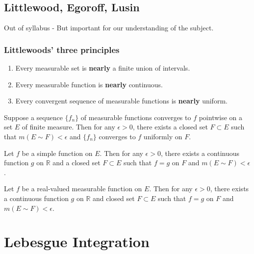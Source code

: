 {\color{violet}
\subsection{Littlewood, Egoroff, Lusin}
Out of syllabus - But important for our understanding of the subject.
\subsubsection{Littlewoods' three principles}
\begin{enumerate}
	\item Every measurable set is \textbf{nearly} a finite union of intervals.
	\item Every measurable function is \textbf{nearly} continuous.
	\item Every convergent sequence of measurable functions is \textbf{nearly} uniform.
\end{enumerate}
\begin{theorem}[Egoroff]
	Suppose a sequence $\{ f_n \}$ of measurable functions converges to $f$ pointwise on a set $E$ of finite measure.
	Then for any $\epsilon > 0$, there exists a closed set $F \subset E$ such that $m(E \sim F) < \epsilon$ and $\{ f_n \}$ converges to $f$ uniformly on $F$.
\end{theorem}

\begin{theorem}
	Let $f$ be a simple function on $E$.
	Then for any $\epsilon > 0$, there exists a continuous function $g$ on $\mathbb{R}$ and a closed set $F \subset E$ such that $f =g$ on $F$ and $m(E \sim F) < \epsilon$.
\end{theorem}

\begin{theorem}[Lusin]
	Let $f$ be a real-valued measurable function on $E$.
	Then for any $\epsilon > 0$, there exists a continuous function $g$ on $\mathbb{R}$ and closed set $F \subset E$ such that $f=g$ on $F$ and $m(E \sim F) < \epsilon$.
\end{theorem}
}
\section{Lebesgue Integration}
